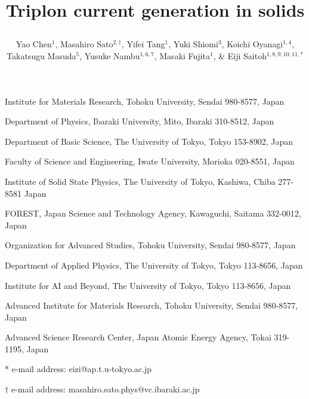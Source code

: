 \documentclass{nature}
\title{\begin{center}
Triplon current generation in solids
\end{center}
}
\author{ Yao Chen$^{1}$, Masahiro Sato$^{2,\dagger}$, Yifei Tang$^1$,  Yuki Shiomi$^{3}$, Koichi Oyanagi$^{1,4}$,
 Takatsugu Masuda$^{5}$,  Yusuke Nambu$^{1,6,7}$, Masaki Fujita$^{1}$,  \& Eiji Saitoh$^{1,8,9,10,11,*}$}
\begin{document}
\maketitle

\begin{affiliations}
 \item Institute for Materials Research, Tohoku University, Sendai 980-8577, Japan
 \item Department of Physics, Ibaraki University, Mito, Ibaraki 310-8512, Japan
\item Department of Basic Science, The University of Tokyo, Tokyo 153-8902, Japan
 \item Faculty of Science and Engineering, Iwate University, Morioka 020-8551, Japan
 \item Institute of Solid State Physics, The University of Tokyo, Kashiwa, Chiba 277-8581 Japan
 \item FOREST, Japan Science and Technology Agency, Kawaguchi, Saitama 332-0012, Japan
 \item Organization for Advanced Studies, Tohoku University, Sendai 980-8577, Japan
 \item Department of Applied Physics, The University of Tokyo, Tokyo 113-8656, Japan
 \item Institute for AI and Beyond, The University of Tokyo, Tokyo 113-8656, Japan
 \item Advanced Institute for Materials Research, Tohoku University, Sendai 980-8577, Japan
 \item Advanced Science Research Center, Japan Atomic Energy Agency, Tokai 319-1195, Japan 
 \item[] * e-mail address: eizi@ap.t.u-tokyo.ac.jp
 \item[] $\dagger$ e-mail address: masahiro.sato.phys@vc.ibaraki.ac.jp
\end{affiliations}
\end{document}
